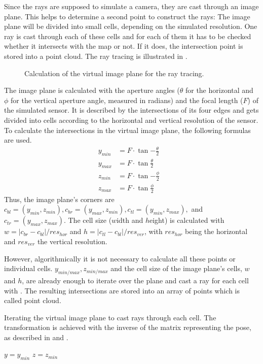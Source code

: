 \documentclass[Thesis.tex]{subfiles}
\begin{document}
Since the rays are supposed to simulate a camera, they are cast through an image plane. This helps to determine a second point to construct the rays: The image plane will be divided into small cells, depending on the simulated resolution. One ray is cast through each of these cells and for each of them it has to be checked whether it intersects with the map or not. If it does, the intersection point is stored into a point cloud. The ray tracing is illustrated in .
%
\begin{figure}[!htp]
  \centering
  
  \caption[Ray tracing]{Calculation of the virtual image plane for the ray tracing.}
  \label{fig:raytrace_scheme}
\end{figure}
%
The image plane is calculated with the aperture angles ($\theta$ for the horizontal and $\phi$ for the vertical aperture angle, measured in radians) and the focal length ($F$) of the simulated sensor. It is described by the intersections of its four edges and gets divided into cells according to the horizontal and vertical resolution of the sensor. To calculate the intersections in the virtual image plane, the following formulas are used.
%
\begin{align}
y_{min} &= F \cdot \tan{-\frac{\theta}{2}} &\label{form:image_plane} \\
y_{max} &= F \cdot \tan{ \frac{\theta}{2}} &\\
z_{min} &= F \cdot \tan{-\frac{\phi}{2}}   &\\
z_{max} &= F \cdot \tan{ \frac{\phi}{2}}   &
\end{align}
%
Thus, the image plane's corners are $c_{bl}=(y_{min}, z_{min}), c_{br}=(y_{max}, z_{min}), c_{tl}=(y_{min}, z_{max}),$ and $c_{tr}=(y_{max}, z_{max})$. The cell size ($w$idth and $h$eight) is calculated with $w=|c_{br}-c_{bl}|/res_{hor}$ and $h=|c_{tl}-c_{bl}|/res_{ver}$, with $res_{hor}$ being the horizontal and $res_{ver}$ the vertical resolution.

However, algorithmically it is not necessary to calculate all these points or individual cells. $y_{min/max}, z_{min/max}$ and the cell size of the image plane's cells, $w$ and $h$, are already enough to iterate over the plane and cast a ray for each cell with . The resulting intersections are stored into an array of points which is called point cloud.
%
\begin{algorithm}[!htp]
\caption[Ray tracing]{Iterating the virtual image plane to cast rays through each cell. The transformation is achieved with the inverse of the matrix representing the pose, as described in  and .}
\label{alg:iterate_imageplane}
$y = y_{min}$\;
$z = z_{min}$\;
\end{algorithm}
\end{document}
